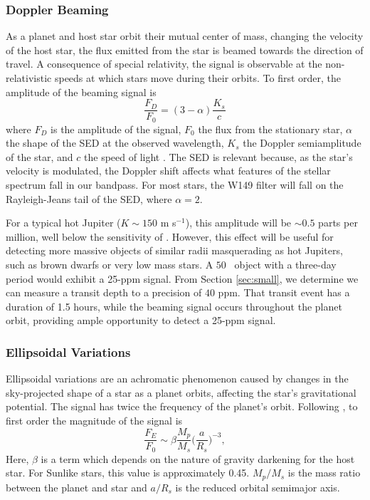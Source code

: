 \subsubsection{Doppler Beaming}

As a planet and host star orbit their mutual center of mass, changing the velocity of the
host star, the flux emitted from the star is beamed towards the direction of travel.
A consequence of special relativity, the signal is observable at the non-relativistic
speeds at which stars move during their orbits.
To first order, the amplitude of the beaming signal is 
\begin{equation}
\frac{F_D}{F_0} = (3-\alpha)\frac{K_s}{c}
\end{equation}
where $F_D$ is the amplitude of the signal, $F_0$ the flux from the stationary star,
$\alpha$ the shape of the SED at the observed wavelength, $K_s$ the
Doppler semiamplitude of the star, and $c$ the speed of light \citep{Loeb03}.
The SED is relevant because, as the star's velocity is modulated, the Doppler shift
affects what features of the stellar spectrum fall in our bandpass.
For most stars, the W149 filter will fall on the Rayleigh-Jeans tail of the SED,
where $\alpha = 2$.

For a typical hot Jupiter ($K \sim 150$ m s$^{-1}$), this amplitude will be
$\sim 0.5$ parts per million, well below the sensitivity of \WF. 
However, this effect will be useful for detecting more massive objects of similar radii
masquerading as 
hot Jupiters, such as brown dwarfs or very low mass stars.
A $50$ \mjup\ object with a three-day period would exhibit a 25-ppm signal.
From Section \ref{sec:small}, we determine we can measure a transit depth
to a precision of $40$ ppm. 
That transit event has a duration of 1.5 hours, while the beaming signal occurs
throughout the planet orbit, providing ample opportunity to detect a 25-ppm signal.


\subsubsection{Ellipsoidal Variations}

Ellipsoidal variations are an achromatic phenomenon caused by changes in the sky-projected
shape of a star as a planet orbits, affecting the star's gravitational potential.
The signal has twice the frequency of the planet's orbit. 
Following \citet{Loeb03}, to first order the magnitude of the signal is
\begin{equation}
\frac{F_E}{F_0} \sim \beta \frac{M_p}{M_s} \bigg(\frac{a}{R_s}\bigg)^{-3},
\end{equation}
Here, $\beta$ is a term which depends on the nature of gravity darkening for the host star.
For Sunlike stars, this value is approximately 0.45. $M_p/M_s$ is the mass ratio between the planet and star and $a/R_s$ is the reduced orbital semimajor axis.

